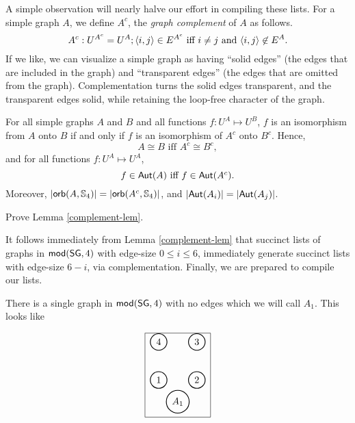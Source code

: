 A simple observation will  nearly halve our effort in compiling these lists. For a simple graph $A$, we define $A^c$, the \emph{graph complement} of $A$ as follows.
\[ A^c: U^{A^c}= U^A; \mbox{$\langle i,j \rangle$}\in E^{A^c}\mbox{ iff } i\neq j \mbox{ and } \mbox{$\langle i,j \rangle$}\not\in E^A.\]
If we like, we can visualize a simple graph as having ``solid edges'' (the edges that are included in the graph) and ``transparent edges'' (the edges that are omitted from the graph). Complementation turns the solid edges transparent, and the transparent edges solid, while retaining the loop-free character of the graph. 
\begin{lemma}\label{complement-lem}
For all simple graphs $A$ and $B$ and all functions $f:U^A\mapsto U^B$,
$f$ is an isomorphism from $A$ onto $B$ if and only if $f$ is an isomorphism of $A^c$ onto $B^c$. Hence,
\[
A\cong B \mbox{ iff } A^c\cong B^c,
\]
and for all functions $f:U^A\mapsto U^A$,
\[
f\in\mbox{$\mathsf{Aut}(A)$} \mbox{ iff } f\in\mbox{$\mathsf{Aut}(A^c)$}.
\]
Moreover,
$\mbox{$|\mbox{$\mathsf{orb}(A,\mbox{$\mathbb{S}_{4}$})$}|$} = \mbox{$|\mbox{$\mathsf{orb}(A^c,\mbox{$\mathbb{S}_{4}$})$}|$}$, and $\mbox{$|\mbox{$\mathsf{Aut}(A_i)$}|$} = \mbox{$|\mbox{$\mathsf{Aut}(A_j)$}|$}$.
\end{lemma}
\begin{aside}
Prove Lemma \ref{complement-lem}.
\end{aside}

It follows immediately from Lemma \ref{complement-lem} that succinct lists of graphs in  $\mbox{$\mathsf{mod}(\mbox{$\mathsf{SG}$},4)$}$ with edge-size $0\leq i\leq 6$, immediately generate succinct lists with edge-size $6-i$, via complementation. 
Finally, we are prepared to compile our lists.

 There is a single graph in $\mbox{$\mathsf{mod}(\mbox{$\mathsf{SG}$},4)$}$ with no edges which we will call $A_1$. This looks like

\[
    \begin{array}{|l|}
    \hline
    \begin{tikzpicture}
[scale=.2]
\begin{scope}[every node/.style={circle,thick,draw}]
    \node (1) at (0,4) {1};
    \node (2) at (7,4) {2};
    \node (3) at (7,11) {3};
    \node (4) at (0,11) {4};
   \node(A) at (3.5,0) {$A_1$};
\end{scope}
\end{tikzpicture}\\
\hline
\end{array}
\]

